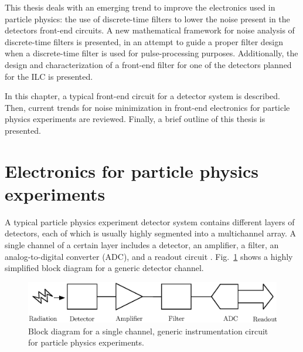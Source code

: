 This thesis deals with an emerging trend to improve the electronics used in particle physics: the use of discrete-time filters to lower the noise present in the detectors front-end circuits. A new mathematical framework for noise analysis of discrete-time filters is presented, in an attempt to guide a proper filter design when a discrete-time filter is used for pulse-processing purposes. Additionally, the design and characterization of a front-end filter for one of the detectors planned for the ILC is presented.

In this chapter, a typical front-end circuit for a detector system is described. Then, current trends for noise minimization in front-end electronics for particle physics experiments are reviewed. Finally, a brief outline of this thesis is presented.

\section{Electronics for particle physics experiments}
A typical particle physics experiment detector system contains different layers of detectors, each of which is usually highly segmented into a multichannel array. A single channel of a certain layer includes a detector, an amplifier, a filter, an analog-to-digital converter (ADC), and a readout circuit \citep{spieler2005semiconductor}. Fig.~\ref{fig:intint} shows a highly simplified block diagram for a generic detector channel. 

\begin{figure}
	\centering
    \includegraphics[width=5in]{./Figures/detector.eps}
	\caption{Block diagram for a single channel, generic instrumentation circuit for particle physics experiments.}
	\label{fig:intint}
\end{figure}

